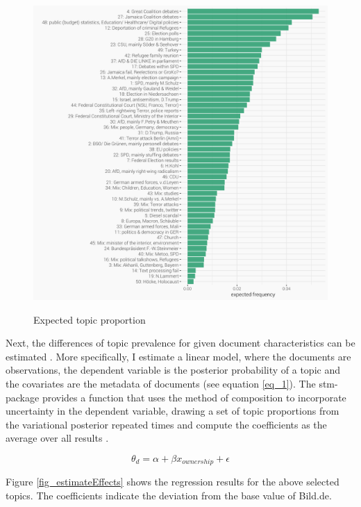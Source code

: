 \documentclass[12pt,a4paper,notitlepage]{article}
\begin{document}
\begin{figure}[H]
	\begin{center}
	\caption{Expected topic proportion}
		\includegraphics[width=\textwidth,keepaspectratio]{../figs/topic_proportion.png}
		\label{fig_topic_proportion}
\end{center}
\end{figure}

Next, the differences of topic prevalence for given document characteristics can be estimated \citep{roberts_model_2016}. More specifically, I estimate a linear model, where the documents are observations, the dependent variable is the posterior probability of a topic and the covariates are the metadata of documents (see equation \ref{eq_1}). The stm-package provides a function that uses the method of composition to incorporate uncertainty in the dependent variable, drawing a set of topic proportions from the variational posterior repeated times and compute the coefficients as the average over all results \citep{roberts_stm:_2016}.

\begin{equation}\label{eq_1}
	\theta_d=\alpha+\beta x_{ownership}+\epsilon
\end{equation}

Figure \ref{fig_estimateEffects} shows the regression results for the above selected topics. The coefficients indicate the deviation from the base value of Bild.de.  
\end{document}
